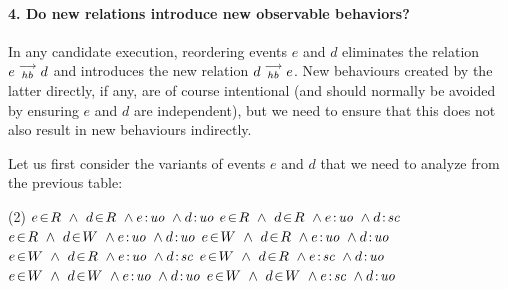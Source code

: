 
\paragraph{4. Do new relations introduce new observable behaviors?}
    In any candidate execution, reordering events $e$ and $d$ eliminates the relation $e\stackrel{\longrightarrow}{_{hb}}d$ and introduces the new relation $d\stackrel{\longrightarrow}{_{hb}}e$. 
    New behaviours created by the latter directly, if any, are 
    of course intentional (and should normally be avoided by ensuring $e$ and $d$ are independent), but we need to ensure that this does not also result in new behaviours indirectly. 
    
    Let us first consider the variants of events $e$ and $d$ that we need to analyze from the previous table:
    \begin{tasks}(2)
        \task $\event{e}{R} \ \wedge \ \event{d}{R} \ \wedge \et{e}{uo} \ \wedge \et{d}{uo}$
        \task $\event{e}{R} \ \wedge \ \event{d}{R} \ \wedge \et{e}{uo} \ \wedge \et{d}{sc}$
        \task $\event{e}{R} \ \wedge \ \event{d}{W} \ \wedge \et{e}{uo} \ \wedge \et{d}{uo}$
        \task $\event{e}{W} \ \wedge \ \event{d}{R} \ \wedge \et{e}{uo} \ \wedge \et{d}{uo}$
        \task $\event{e}{W} \ \wedge \ \event{d}{R} \ \wedge \et{e}{uo} \ \wedge \et{d}{sc}$
        \task $\event{e}{W} \ \wedge \ \event{d}{R} \ \wedge \et{e}{sc} \ \wedge \et{d}{uo}$
        \task $\event{e}{W} \ \wedge \ \event{d}{W} \ \wedge \et{e}{uo} \ \wedge \et{d}{uo}$
        \task $\event{e}{W} \ \wedge \ \event{d}{W} \ \wedge \et{e}{sc} \ \wedge \et{d}{uo}$
    \end{tasks}

